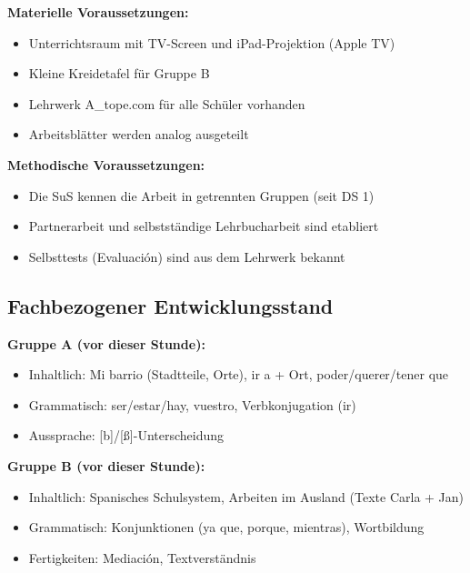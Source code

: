 \documentclass[11pt, a4paper]{article}
\begin{document}
\textbf{Materielle Voraussetzungen:}
\begin{itemize}[leftmargin=2em]
    \item Unterrichtsraum mit TV-Screen und iPad-Projektion (Apple TV)
    \item Kleine Kreidetafel für Gruppe B
    \item Lehrwerk A\_tope.com für alle Schüler vorhanden
    \item Arbeitsblätter werden analog ausgeteilt
\end{itemize}

\textbf{Methodische Voraussetzungen:}
\begin{itemize}[leftmargin=2em]
    \item Die SuS kennen die Arbeit in getrennten Gruppen (seit DS 1)
    \item Partnerarbeit und selbstständige Lehrbucharbeit sind etabliert
    \item Selbsttests (Evaluación) sind aus dem Lehrwerk bekannt
\end{itemize}

\subsection{Fachbezogener Entwicklungsstand}

\textbf{Gruppe A (vor dieser Stunde):}
\begin{itemize}[leftmargin=2em]
    \item Inhaltlich: Mi barrio (Stadtteile, Orte), ir a + Ort, poder/querer/tener que
    \item Grammatisch: ser/estar/hay, vuestro, Verbkonjugation (ir)
    \item Aussprache: [b]/[ß]-Unterscheidung
\end{itemize}

\textbf{Gruppe B (vor dieser Stunde):}
\begin{itemize}[leftmargin=2em]
    \item Inhaltlich: Spanisches Schulsystem, Arbeiten im Ausland (Texte Carla + Jan)
    \item Grammatisch: Konjunktionen (ya que, porque, mientras), Wortbildung
    \item Fertigkeiten: Mediación, Textverständnis
\end{itemize}

\end{document}
